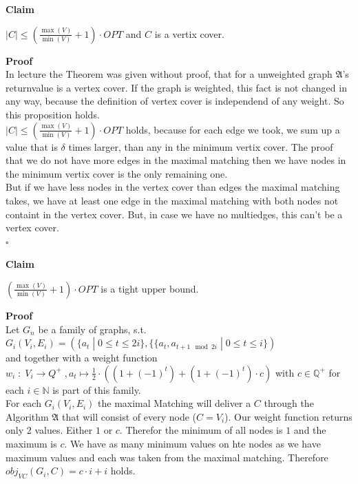 \documentclass[11pt,a4paper,ngerman]{article}
\newcommand{\claim}{\addtocounter{claims}{1} \bfseries Claim \arabic{claims}}
\newcommand{\proof}{\bfseries Proof}
\begin{document}
\begin{description}
\item{\claim} $|C| \leq \left( \frac{\max (V)}{\min (V)} + 1 \right) \cdot OPT$ and $C$ is a vertix cover. 
\item{\proof}\\
In lecture the Theorem was given without proof, that for a unweighted graph $\mathfrak{A}$'s returnvalue is a vertex cover. If the graph is weighted, this fact is not changed in any way, because the definition of vertex cover is independend of any weight. So this proposition holds.\\

$|C| \leq \left( \frac{\max (V)}{\min (V)} + 1 \right) \cdot OPT$ holds, because for each edge we took, we sum up a value that is $\delta$ times larger, than any in the minimum vertix cover. The proof that we do not have more edges in the maximal matching then we have nodes in the minimum vertix cover is the only remaining one.\\
But if we have less nodes in the vertex cover than edges the maximal matching takes, we have at least one edge in the maximal matching with both nodes not containt in the vertex cover. But, in case we have no multiedges, this can't be a vertex cover.\\
\mbox{}\hfill $\square$

\pagebreak

\item{\claim} $ \left( \frac{\max (V)}{\min (V)} + 1 \right) \cdot OPT$ is a tight upper bound.
\item{\proof} \\Let $G_n$ be a family of graphs, s.t. \\$G_i(V_i,E_i) = (\{a_t \; | \; 0 \leq t \leq 2i \}, \{ \{a_t, a_{t+1 \mod 2i} \; | \; 0 \leq t \leq i \})$ \\and together with a weight function \\$w_i \; : \; V_i \rightarrow Q^+ \; , a_t \mapsto \frac{1}{2} \cdot \left( (1+(-1)^t) + (1+(-1)^t) \cdot c \right)$ with $c \in \mathbb{Q}^+$ for each $i \in \mathbb{N}$ is part of this family.\\

For each $G_i(V_i,E_i)$ the maximal Matching will deliver a $C$ through the Algorithm $\mathfrak{A}$ that will consist of every node ($C=V_i$). Our weight function returns only 2 values. Either $1$ or $c$. Therefor the minimum of all nodes is $1$ and the maximum is $c$. We have as many minimum values on hte nodes as we have maximum values and each was taken from the maximal matching. Therefore $obj_{VC} (G_i, C) = c\cdot i + i$ holds.\\


\end{description}
\end{document}
